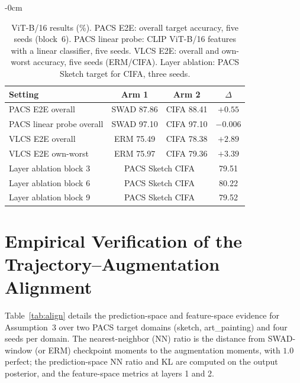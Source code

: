 \documentclass[electronics,article,submit,moreauthors]{Definitions/mdpi}
\begin{document}
\begin{adjustwidth}{-\extralength}{0cm}
\begin{table}[H]
\centering
\caption{ViT-B/16 results (\%). PACS E2E: overall target accuracy, five seeds (block~6). PACS linear probe: CLIP ViT-B/16 features with a linear classifier, five seeds. VLCS E2E: overall and own-worst accuracy, five seeds (ERM/CIFA). Layer ablation: PACS Sketch target for CIFA, three seeds.}
\label{tab:vit}
\setlength{\tabcolsep}{5pt}
\footnotesize
\begin{tabular}{lccc}
\toprule
\textbf{Setting} & \textbf{Arm 1} & \textbf{Arm 2} & \textbf{$\Delta$}\\
\midrule
PACS E2E overall & SWAD 87.86 & CIFA 88.41 & $+0.55$\\
PACS linear probe overall & SWAD 97.10 & CIFA 97.10 & $-0.006$\\
VLCS E2E overall & ERM 75.49 & CIFA 78.38 & $+2.89$\\
VLCS E2E own-worst & ERM 75.97 & CIFA 79.36 & $+3.39$\\
\midrule
Layer ablation block 3 & \multicolumn{2}{c}{PACS Sketch CIFA} & 79.51\\
Layer ablation block 6 & \multicolumn{2}{c}{PACS Sketch CIFA} & 80.22\\
Layer ablation block 9 & \multicolumn{2}{c}{PACS Sketch CIFA} & 79.52\\
\bottomrule
\end{tabular}
\end{table}

\section{Empirical Verification of the Trajectory--Augmentation Alignment}
\label{sec:appalign}

Table~\ref{tab:align} details the prediction-space and feature-space evidence for Assumption~3 over two PACS target domains (sketch, art\_painting) and four seeds per domain. The nearest-neighbor (NN) ratio is the distance from SWAD-window (or ERM) checkpoint moments to the augmentation moments, with $1.0$ perfect; the prediction-space NN ratio and KL are computed on the output posterior, and the feature-space metrics at layers 1 and 2.


\end{adjustwidth}
\end{document}
